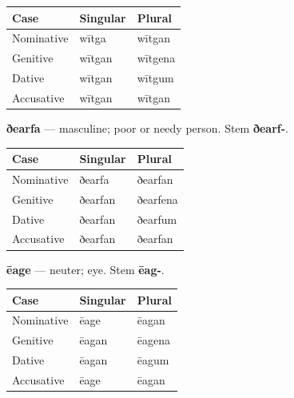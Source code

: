 \par\begingroup
\fontsize{10.5}{13.2}\selectfont
\setlength{\LTleft}{0pt}\setlength{\LTright}{\fill}
\noindent
\begin{tabular}{@{}>{\raggedright\arraybackslash}p{39.46mm}>{\raggedright\arraybackslash}p{39.46mm}>{\raggedright\arraybackslash}p{39.46mm}@{}}
\toprule
\textbf{Case} & \textbf{Singular} & \textbf{Plural} \\
\midrule
Nominative & wītga & wītgan \\
Genitive & wītgan & wītgena \\
Dative & wītgan & wītgum \\
Accusative & wītgan & wītgan \\
\bottomrule
\end{tabular}
\par\endgroup

\textbf{ðearfa} — masculine; poor or needy person. Stem \textbf{ðearf-}.

\par\begingroup
\fontsize{10.5}{13.2}\selectfont
\setlength{\LTleft}{0pt}\setlength{\LTright}{\fill}
\noindent
\begin{tabular}{@{}>{\raggedright\arraybackslash}p{39.46mm}>{\raggedright\arraybackslash}p{39.46mm}>{\raggedright\arraybackslash}p{39.46mm}@{}}
\toprule
\textbf{Case} & \textbf{Singular} & \textbf{Plural} \\
\midrule
Nominative & ðearfa & ðearfan \\
Genitive & ðearfan & ðearfena \\
Dative & ðearfan & ðearfum \\
Accusative & ðearfan & ðearfan \\
\bottomrule
\end{tabular}
\par\endgroup

\textbf{ēage} — neuter; eye. Stem \textbf{ēag-}.

\par\begingroup
\fontsize{10.5}{13.2}\selectfont
\setlength{\LTleft}{0pt}\setlength{\LTright}{\fill}
\noindent
\begin{tabular}{@{}>{\raggedright\arraybackslash}p{39.46mm}>{\raggedright\arraybackslash}p{39.46mm}>{\raggedright\arraybackslash}p{39.46mm}@{}}
\toprule
\textbf{Case} & \textbf{Singular} & \textbf{Plural} \\
\midrule
Nominative & ēage & ēagan \\
Genitive & ēagan & ēagena \\
Dative & ēagan & ēagum \\
Accusative & ēage & ēagan \\
\bottomrule
\end{tabular}
\par\endgroup

